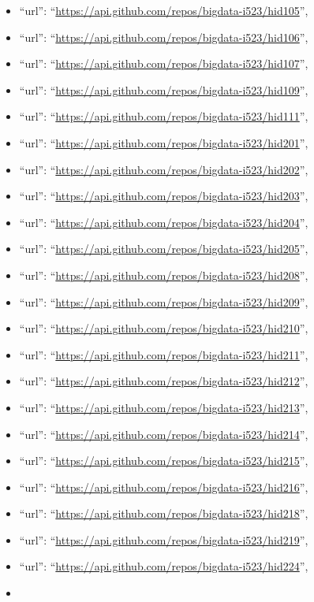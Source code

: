 \begin{itemize}
\item
  ``url'': ``\url{https://api.github.com/repos/bigdata-i523/hid105}'',
\item
  ``url'': ``\url{https://api.github.com/repos/bigdata-i523/hid106}'',
\item
  ``url'': ``\url{https://api.github.com/repos/bigdata-i523/hid107}'',
\item
  ``url'': ``\url{https://api.github.com/repos/bigdata-i523/hid109}'',
\item
  ``url'': ``\url{https://api.github.com/repos/bigdata-i523/hid111}'',
\item
  ``url'': ``\url{https://api.github.com/repos/bigdata-i523/hid201}'',
\item
  ``url'': ``\url{https://api.github.com/repos/bigdata-i523/hid202}'',
\item
  ``url'': ``\url{https://api.github.com/repos/bigdata-i523/hid203}'',
\item
  ``url'': ``\url{https://api.github.com/repos/bigdata-i523/hid204}'',
\item
  ``url'': ``\url{https://api.github.com/repos/bigdata-i523/hid205}'',
\item
  ``url'': ``\url{https://api.github.com/repos/bigdata-i523/hid208}'',
\item
  ``url'': ``\url{https://api.github.com/repos/bigdata-i523/hid209}'',
\item
  ``url'': ``\url{https://api.github.com/repos/bigdata-i523/hid210}'',
\item
  ``url'': ``\url{https://api.github.com/repos/bigdata-i523/hid211}'',
\item
  ``url'': ``\url{https://api.github.com/repos/bigdata-i523/hid212}'',
\item
  ``url'': ``\url{https://api.github.com/repos/bigdata-i523/hid213}'',
\item
  ``url'': ``\url{https://api.github.com/repos/bigdata-i523/hid214}'',
\item
  ``url'': ``\url{https://api.github.com/repos/bigdata-i523/hid215}'',
\item
  ``url'': ``\url{https://api.github.com/repos/bigdata-i523/hid216}'',
\item
  ``url'': ``\url{https://api.github.com/repos/bigdata-i523/hid218}'',
\item
  ``url'': ``\url{https://api.github.com/repos/bigdata-i523/hid219}'',
\item
  ``url'': ``\url{https://api.github.com/repos/bigdata-i523/hid224}'',
\item

\end{itemize}
